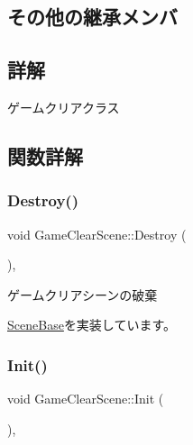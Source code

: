 \subsection*{その他の継承メンバ}


\subsection{詳解}
ゲームクリアクラス 

\subsection{関数詳解}
\mbox{\label{class_game_clear_scene_a5a3a9e62bb0244b164d9e34663e99594}} 
\subsubsection{\texorpdfstring{Destroy()}{Destroy()}}
{\footnotesize\ttfamily void Game\+Clear\+Scene\+::\+Destroy (\begin{DoxyParamCaption}{ }\end{DoxyParamCaption})\hspace{0.3cm}{\ttfamily [final]}, {\ttfamily [virtual]}}



ゲームクリアシーンの破棄 



\mbox{\hyperlink{class_scene_base_a7c5b54020bc519b4dadfe9770d6b27f7}{Scene\+Base}}を実装しています。

\mbox{\label{class_game_clear_scene_a59fcf2b5d5d7197d37ecb85c54e7712a}} 
\subsubsection{\texorpdfstring{Init()}{Init()}}
{\footnotesize\ttfamily void Game\+Clear\+Scene\+::\+Init (\begin{DoxyParamCaption}{ }\end{DoxyParamCaption})\hspace{0.3cm}{\ttfamily [final]}, {\ttfamily [virtual]}}



